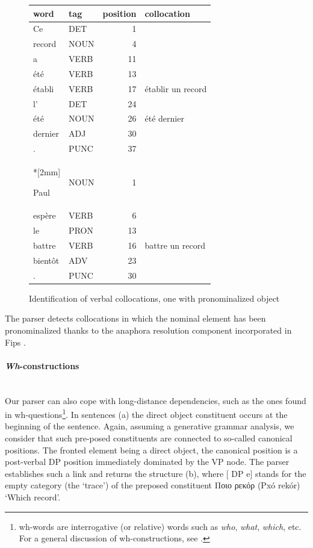 \documentclass[output=paper]{langsci/langscibook}
\begin{document}
\begin{figure}[h]
  {\small 
\begin{tabular}{llrl}
word & tag & position & collocation \\ \hline
Ce &	DET &	1	\\
record &	NOUN	 & 4	\\	
a	& VERB & 	11	\\
été &	VERB & 	13		\\
établi	 & VERB	 & 17	 & 	établir un record\\
l' &	DET & 	24	\\
été	 & NOUN	 & 26		 & 	été dernier\\
dernier & 	ADJ	 & 30			\\
.	 & PUNC	 & 37		\\*[2mm]

Paul & 	NOUN	 & 1\\
espère & 	VERB & 	6	\\
le	 & PRON & 13	\\
battre & 	VERB	 & 16	  & 	battre un record\\
bientôt & ADV	 & 23			\\
.	 & PUNC & 	30			\\


\end{tabular}
  }
 \caption{\label{fig3}Identification of verbal collocations, one with pronominalized object}
\end{figure} 



The parser detects collocations in which the nominal element has been pron\-ominalized thanks to the anaphora resolution component incorporated in Fips \citep{wn13}. 


\paragraph*{\textit{Wh}-constructions} {~~~} \\
Our parser can also cope with long-distance dependencies, such as the ones found in wh-questions\footnote{wh-words are interrogative (or relative) words such as \textit{who}, \textit{what}, \textit{which}, etc. For a general discussion of wh-constructions, see \citep{chomsky77}.}. In sentences (a) the direct object constituent occurs at the beginning of the sentence. Again, assuming a generative grammar analysis, we consider that such pre-posed constituents are connected to so-called canonical positions. The fronted element being a direct object, the canonical position is a post-verbal DP position immediately dominated by the VP node. The parser establishes such a link and returns the structure (b), where [ DP e] stands for the empty category (the `trace') of the preposed constituent {Ποιο ρεκόρ} (Pxó rekór) `Which record'. 
\end{document}
